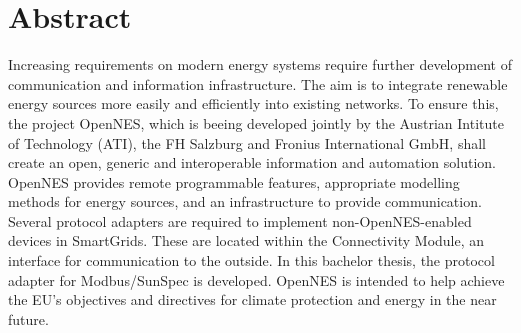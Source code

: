 \section*{\Large\bfseries Abstract}

Increasing requirements on modern energy systems require  further development of  communication and information infrastructure. The aim is to integrate renewable energy sources more easily and efficiently into existing networks. 
To ensure this, the project OpenNES, which is beeing developed jointly by the Austrian Intitute of Technology (ATI), the FH Salzburg and Fronius International GmbH, shall  create an open, generic and interoperable information and automation solution. 
OpenNES provides remote programmable features, appropriate modelling methods for energy sources, and an infrastructure to provide communication. 
Several protocol adapters are required to implement non-OpenNES-enabled devices in SmartGrids. These are located within the Connectivity Module, an interface for communication to the outside. 
In this bachelor thesis, the protocol adapter for Modbus/SunSpec is developed. 
OpenNES is intended to help achieve the EU's objectives and directives for climate protection and energy in the near future. 
